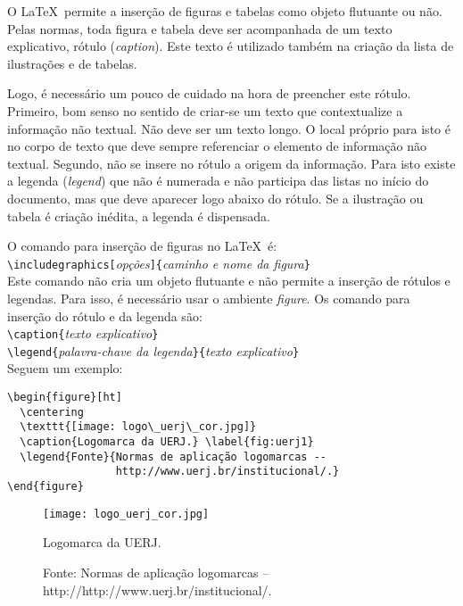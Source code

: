 \documentclass[a4paper,12pt,oneside,onecolumn]{article}
\newcommand{\comando}[1]{\texttt{\textbackslash #1}}
\newcommand{\opcoes}[1]{\texttt{[}\textsl{#1}\texttt{]}}
\newcommand{\param}[1]{\texttt{\{}\textsl{#1}\texttt{\}}}
\begin{document}
O \LaTeX\ permite a inserção de figuras e tabelas como objeto flutuante ou não. Pelas normas, toda figura e tabela deve ser acompanhada de um texto explicativo, rótulo (\textsl{caption}). Este texto é utilizado também na criação da lista de ilustrações e de tabelas.

Logo, é necessário um pouco de cuidado na hora de preencher este rótulo. Primeiro, bom senso no sentido de criar-se um texto que contextualize a informação não textual. Não deve ser um texto longo. O local próprio para isto é no corpo de texto que deve sempre referenciar o elemento de informação não textual. Segundo, não se insere no rótulo a origem da informação. Para isto existe a legenda (\textsl{legend}) que não é numerada e não participa das listas no início do documento, mas que deve aparecer logo abaixo do rótulo. Se a ilustração ou tabela é criação inédita, a legenda é dispensada.

O comando para inserção de figuras no \LaTeX\ é:\\

\comando{includegraphics}\opcoes{opções}\param{caminho e nome da figura}\\

Este comando não cria um objeto flutuante e não permite a inserção de rótulos e legendas. Para isso, é necessário usar o ambiente \textsl{figure}. Os comando para inserção do rótulo e da legenda são:\\

\comando{caption}\param{texto explicativo}\\

\comando{legend}\param{palavra-chave da legenda}\param{texto explicativo}\\

Seguem um exemplo:

\begin{verbatim}
\begin{figure}[ht]
  \centering
  \texttt{[image: logo\_uerj\_cor.jpg]}
  \caption{Logomarca da UERJ.} \label{fig:uerj1}
  \legend{Fonte}{Normas de aplicação logomarcas -- 
                 http://www.uerj.br/institucional/.}
\end{figure}
\end{verbatim}

\begin{figure}[ht]
  \centering
  \texttt{[image: logo\_uerj\_cor.jpg]}
  \caption{Logomarca da UERJ.} \label{fig:uerj1}
  \caption*{Fonte: Normas de aplicação logomarcas -- http://http://www.uerj.br/institucional/.}
\end{figure}
\end{document}
